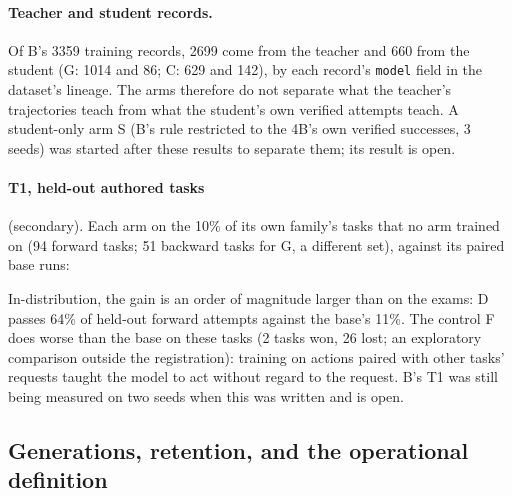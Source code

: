 \paragraph{Teacher and student records.} Of B's 3359 training records, 2699 come from the teacher and 660 from the student
(G: 1014 and 86; C: 629 and 142), by each record's \texttt{model} field in the dataset's lineage. The arms therefore do not
separate what the teacher's trajectories teach from what the student's own verified attempts teach. A student-only arm S
(B's rule restricted to the 4B's own verified successes, 3 seeds) was started after these results to separate them; its
result is open.

\paragraph{T1, held-out authored tasks} (secondary). Each arm on the 10\% of its own family's tasks that no arm trained on
(94 forward tasks; 51 backward tasks for G, a different set), against its paired base runs:

\begin{center}\footnotesize
{}
\end{center}

In-distribution, the gain is an order of magnitude larger than on the exams: D passes 64\% of held-out forward attempts
against the base's 11\%. The control F does worse than the base on these tasks (2 tasks won, 26 lost; an exploratory
comparison outside the registration): training on actions paired with other tasks' requests taught the model to act without
regard to the request. B's T1 was still being measured on two seeds when this was written and is open.

\subsection{Generations, retention, and the operational definition}\label{sec:vim-verdict}

